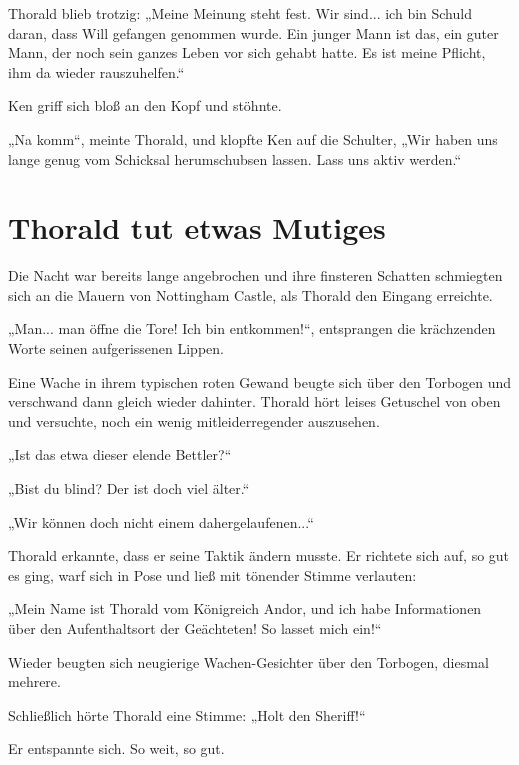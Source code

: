 Thorald blieb trotzig: „Meine Meinung steht fest. Wir sind... ich bin Schuld daran, dass Will gefangen genommen wurde. Ein junger Mann ist das, ein guter Mann, der noch sein ganzes Leben vor sich gehabt hatte. Es ist meine Pflicht, ihm da wieder rauszuhelfen.“

Ken griff sich bloß an den Kopf und stöhnte.

„Na komm“, meinte Thorald, und klopfte Ken auf die Schulter, „Wir haben uns lange genug vom Schicksal herumschubsen lassen. Lass uns aktiv werden.“








\newpage
\section{Thorald tut etwas Mutiges}

Die Nacht war bereits lange angebrochen und ihre finsteren Schatten schmiegten sich an die Mauern von Nottingham Castle, als Thorald den Eingang erreichte.

„Man... man öffne die Tore! Ich bin entkommen!“, entsprangen die krächzenden Worte seinen aufgerissenen Lippen.

Eine Wache in ihrem typischen roten Gewand beugte sich über den Torbogen und verschwand dann gleich wieder dahinter. Thorald hört leises Getuschel von oben und versuchte, noch ein wenig mitleiderregender auszusehen.

„Ist das etwa dieser elende Bettler?“

„Bist du blind? Der ist doch viel älter.“

„Wir können doch nicht einem dahergelaufenen...“

Thorald erkannte, dass er seine Taktik ändern musste. Er richtete sich auf, so gut es ging, warf sich in Pose und ließ mit tönender Stimme verlauten:

„Mein Name ist Thorald vom Königreich Andor, und ich habe Informationen über den Aufenthaltsort der Geächteten! So lasset mich ein!“

Wieder beugten sich neugierige Wachen-Gesichter über den Torbogen, diesmal mehrere.

Schließlich hörte Thorald eine Stimme: „Holt den Sheriff!“

Er entspannte sich. So weit, so gut.



\trennzeichen



